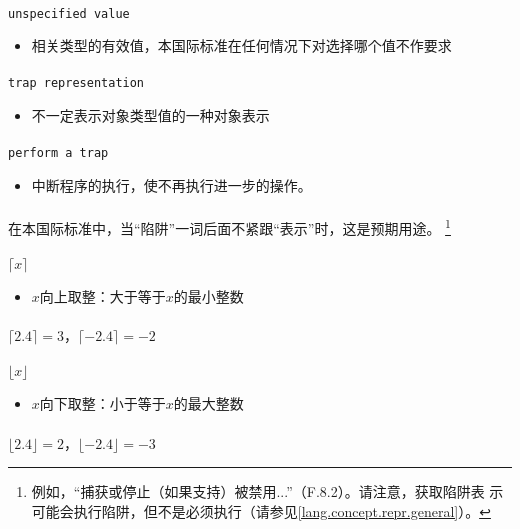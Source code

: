 \paragraph{}
\texttt{unspecified value}
\begin{itemize}
  \item[]{相关类型的有效值，本国际标准在任何情况下对选择哪个值不作要求}
\end{itemize}

\paragraph{}
\texttt{trap representation}
\begin{itemize}
  \item[]{不一定表示对象类型值的一种对象表示}
\end{itemize}

\paragraph{}
\texttt{perform a trap}
\begin{itemize}
  \item[]{中断程序的执行，使不再执行进一步的操作。}
\end{itemize}

\paragraph{}
\notes* 在本国际标准中，当``陷阱''一词后面不紧跟``表示''时，这是预期用途。
\footnote{例如，``捕获或停止（如果支持）被禁用...''（F.8.2）。请注意，获取陷阱表
示可能会执行陷阱，但不是必须执行（请参见\ref{lang.concept.repr.general}）。}

\paragraph{}
\texttt{$\lceil x\rceil$}
\begin{itemize}
  \item[]{$x$向上取整：大于等于$x$的最小整数}
\end{itemize}

\paragraph{}
\ex* $\lceil 2.4 \rceil = 3$，$\lceil -2.4 \rceil = -2$

\paragraph{}
\texttt{$\lfloor x\rfloor$}
\begin{itemize}
  \item[]{$x$向下取整：小于等于$x$的最大整数}
\end{itemize}

\paragraph{}
\ex* $\lfloor 2.4 \rfloor = 2$，$\lfloor -2.4 \rfloor = -3$

